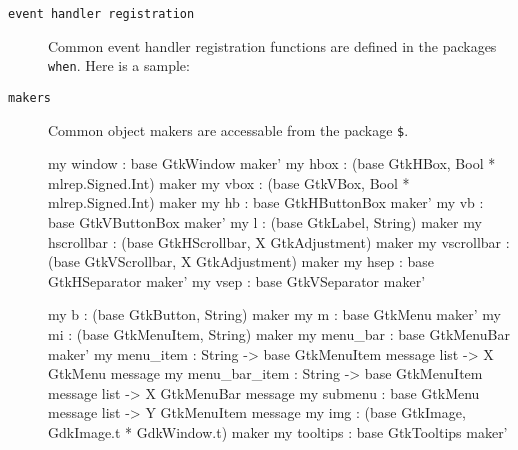 \documentclass{article}
\begin{document}
\begin{description}
 \item[\tt event handler registration]
Common event handler registration functions are defined in the 
packages \verb|when|.  Here is a sample:

 \item[\tt makers]
Common object makers are accessable from the package \verb|$|.
\begin{smldisp}
   my window        : base GtkWindow maker'
   my hbox       : (base GtkHBox, Bool * mlrep.Signed.Int) maker
   my vbox       : (base GtkVBox, Bool * mlrep.Signed.Int) maker
   my hb         : base GtkHButtonBox maker'
   my vb         : base GtkVButtonBox maker'
   my l          : (base GtkLabel, String) maker
   my hscrollbar : (base GtkHScrollbar, X GtkAdjustment) maker
   my vscrollbar : (base GtkVScrollbar, X GtkAdjustment) maker
   my hsep       : base GtkHSeparator maker'
   my vsep       : base GtkVSeparator maker'
\end{smldisp}
\begin{smldisp}
   my b          : (base GtkButton, String) maker
   my m          : base GtkMenu maker'
   my mi         : (base GtkMenuItem, String) maker
   my menu_bar   : base GtkMenuBar maker'
   my menu_item  : String ->
          base GtkMenuItem message list -> X GtkMenu message
   my menu_bar_item : String -> 
           base GtkMenuItem message list -> X GtkMenuBar message
   my submenu    : base GtkMenu message list -> Y GtkMenuItem message
   my img        : (base GtkImage, GdkImage.t * GdkWindow.t) maker
   my tooltips   : base GtkTooltips maker'
\end{smldisp}


\end{description}
\end{document}
